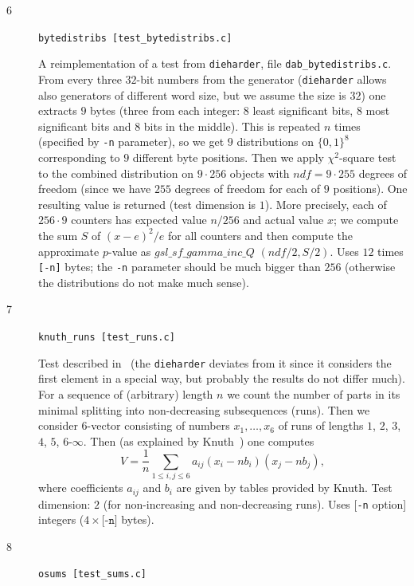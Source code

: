 \documentclass[12pt,a4paper,fullpage]{article}
\begin{document}
\begin{description}
\item[6] \texttt{bytedistribs [test\_bytedistribs.c]}

A reimplementation of a test from \texttt{dieharder}, file \texttt{dab\_bytedistribs.c}. From every three $32$-bit numbers from the generator (\texttt{dieharder} allows also generators of different word size, but we assume the size is $32$) one extracts $9$ bytes (three from each integer: $8$ least significant bits, $8$ most significant bits and $8$ bits in the middle). This is repeated $n$ times (specified by \texttt{-n} parameter), so we get $9$ distributions on $\{0,1\}^8$ corresponding to $9$ different byte positions. Then we apply $\chi^2$-square test to the combined distribution on $9\cdot256$ objects with $\textit{ndf}=9\cdot 255$ degrees of freedom (since we have $255$ degrees of freedom for each of $9$ positions). One resulting value is returned (test dimension is $1$). More precisely, each of $256\cdot 9$ counters has expected value $n/256$ and actual value $x$; we compute the sum $S$ of $(x-e)^2/e$ for all counters and then compute the approximate $p$-value as $\textit{gsl\_sf\_gamma\_inc\_Q}\,\,(\textit{ndf}/2, S/2)$. Uses $12$ times \texttt{[-n]} bytes; the \texttt{-n} parameter should be much bigger than $256$ (otherwise the distributions do not make much sense).
     
\item[7] \texttt{knuth\_runs [test\_runs.c]}

Test described in~\cite[p.~65]{knuth2} (the \texttt{dieharder} deviates from it since it considers the first element in a special way, but probably the results do not differ much).  For a sequence of (arbitrary) length $n$ we count the number of parts in its minimal splitting into non-decreasing subsequences (runs). Then we consider $6$-vector consisting of numbers $x_1,\ldots,x_6$ of runs of lengths $1$, $2$, $3$, $4$, $5$, $6$-$\infty$. Then (as explained by Knuth~\cite{knuth2}) one computes
\[
 V=\frac{1}{n}\sum_{1\le i,j\le 6} a_{ij}(x_i-nb_i)(x_j-nb_j),
\]
where coefficients $a_{ij}$ and $b_{i}$ are given by tables provided by Knuth. Test dimension: $2$ (for non-increasing and non-decreasing runs). Uses [\texttt{-n} option] integers ($4\times\texttt{[-n]}$ bytes).

\item[8] \texttt{osums [test\_sums.c]}


\end{description}
\end{document}
